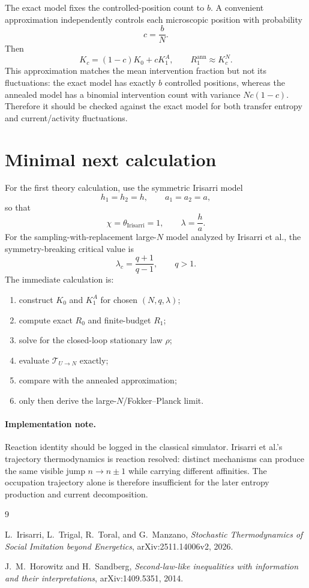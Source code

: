 \documentclass[11pt]{article}
\begin{document}
The exact model fixes the controlled-position count to $b$. A convenient
approximation independently controls each microscopic position with probability
\[
c=\frac{b}{N}.
\]
Then
\[
K_c=(1-c)K_0+cK_1^A,
\qquad
R_1^{\mathrm{ann}}\approx K_c^N.
\]
This approximation matches the mean intervention fraction but not its
fluctuations: the exact model has exactly $b$ controlled positions, whereas the
annealed model has a binomial intervention count with variance $Nc(1-c)$.
Therefore it should be checked against the exact model for both transfer entropy
and current/activity fluctuations.

\section{Minimal next calculation}

For the first theory calculation, use the symmetric Irisarri model
\[
h_1=h_2=h,\qquad a_1=a_2=a,
\]
so that
\[
\chi=\theta_{\mathrm{Irisarri}}=1,
\qquad
\lambda=\frac{h}{a}.
\]
For the sampling-with-replacement large-$N$ model analyzed by Irisarri et al.,
the symmetry-breaking critical value is
\[
\lambda_c=\frac{q+1}{q-1},
\qquad q>1.
\]
The immediate calculation is:
\begin{enumerate}[leftmargin=1.6em]
    \item construct $K_0$ and $K_1^A$ for chosen $(N,q,\lambda)$;
    \item compute exact $R_0$ and finite-budget $R_1$;
    \item solve for the closed-loop stationary law $\rho$;
    \item evaluate $\mathcal{T}_{U\to N}$ exactly;
    \item compare with the annealed approximation;
    \item only then derive the large-$N$/Fokker--Planck limit.
\end{enumerate}

\paragraph{Implementation note.}
Reaction identity should be logged in the classical simulator. Irisarri et al.'s
trajectory thermodynamics is reaction resolved: distinct mechanisms can produce
the same visible jump $n\to n\pm1$ while carrying different affinities. The
occupation trajectory alone is therefore insufficient for the later entropy
production and current decomposition.

\begin{thebibliography}{9}

L.~Irisarri, L.~Trigal, R.~Toral, and G.~Manzano,
\emph{Stochastic Thermodynamics of Social Imitation beyond Energetics},
arXiv:2511.14006v2, 2026.

J.~M.~Horowitz and H.~Sandberg,
\emph{Second-law-like inequalities with information and their interpretations},
arXiv:1409.5351, 2014.

\end{thebibliography}
\end{document}
